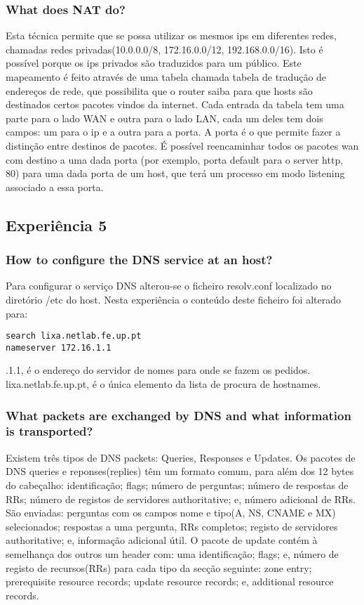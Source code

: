 \documentclass[a4paper]{article}
\begin{document}
\subsubsection{What does NAT do?}
Esta técnica permite que se possa utilizar os mesmos ips em diferentes redes, chamadas redes privadas(10.0.0.0/8, 172.16.0.0/12, 192.168.0.0/16). Isto é possível porque os ips privados são traduzidos para um público. Este mapeamento é feito através de uma tabela chamada tabela de tradução de endereços de rede, que possibilita que o router saiba para que hosts são destinados certos pacotes vindos da internet. Cada entrada da tabela tem uma parte para o lado WAN e outra para o lado LAN, cada um deles tem dois campos: um para o ip e a outra para a porta. A porta é o que permite fazer a distinção entre destinos de pacotes. É possível reencaminhar todos os pacotes wan com destino a uma dada porta (por exemplo, porta default para o server http, 80) para uma dada porta de um host, que terá um processo em modo listening associado a essa porta.
\subsection{Experiência 5}

\subsubsection{How to configure the DNS service at an host?}

Para configurar o serviço DNS alterou-se o ficheiro resolv.conf localizado no diretório /etc do host.
Nesta experiência o conteúdo deste ficheiro foi alterado para:

\begin{verbatim}
search lixa.netlab.fe.up.pt
nameserver 172.16.1.1
\end{verbatim}

.1.1, é o endereço do servidor de nomes para onde se fazem os pedidos.
lixa.netlab.fe.up.pt, é o única elemento da lista de procura de hostnames.

\subsubsection{What packets are exchanged by DNS and what information is transported?}

Existem três tipos de DNS packets: Queries, Responses e Updates. Os pacotes de DNS queries e reponses(replies) têm um formato comum, para além dos 12 bytes do cabeçalho: identificação; flags; número de perguntas; número de respostas de RRs; número de registos de servidores authoritative; e, número adicional de RRs. São enviadas: perguntas com os campos nome e tipo(A, NS, CNAME e MX) selecionados; respostas a uma pergunta, RRs completos; registo de servidores authoritative; e, informação adicional útil. O pacote de update contém à semelhança dos outros um header com: uma identificação; flags; e, número de registo de recursos(RRs) para cada tipo da secção seguinte: zone entry; prerequisite resource records; update resource records; e, additional resource records.
\end{document}
